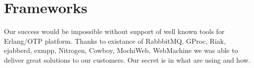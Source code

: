 \documentclass[11pt]{article}
\begin{document}

\section*{Frameworks}
\paragraph{}
Our success would be impossible without support of well known tools for Erlang/OTP platform.
Thanks to existance of RabbbitMQ, GProc, Riak, ejabberd, exmpp, Nitrogen, Cowboy, MochiWeb,
WebMachine we was able to deliver great solutions to our customers. Our secret is in what are using and how.



\end{document}
